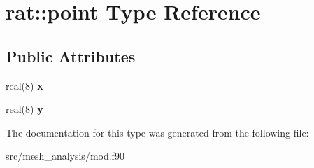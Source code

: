\hypertarget{structrat_1_1point}{}\section{rat\+:\+:point Type Reference}
\label{structrat_1_1point}
\subsection*{Public Attributes}
\begin{DoxyCompactItemize}
\item 
\mbox{\label{structrat_1_1point_a49bb1aa8485fb0f3d57f2f0a2b03cf14}} 
real(8) {\bfseries x}
\item 
\mbox{\label{structrat_1_1point_a30d89b7a1f32336c99c3cb4c1493f06e}} 
real(8) {\bfseries y}
\end{DoxyCompactItemize}


The documentation for this type was generated from the following file\+:\begin{DoxyCompactItemize}
\item 
src/mesh\+\_\+analysis/mod.\+f90\end{DoxyCompactItemize}
